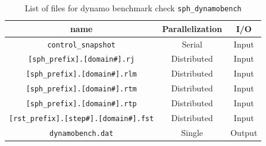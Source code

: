\begin{table}[htdp]
\caption{List of files for dynamo benchmark check {\tt sph\_dynamobench} }
\begin{center} 
\begin{tabular}{|c|c|c|}
\hline
 name & Parallelization & I/O \\ \hline \hline
\verb|control_snapshot| & Serial & Input \\ \hline
\verb|[sph_prefix].[domain#].rj|  & Distributed & Input \\
\verb|[sph_prefix].[domain#].rlm| & Distributed & Input \\
\verb|[sph_prefix].[domain#].rtm| & Distributed & Input \\
\verb|[sph_prefix].[domain#].rtp| & Distributed & Input \\ \hline
\verb|[rst_prefix].[step#].[domain#].fst| &  Distributed & Input  \\ \hline
\verb|dynamobench.dat| & Single & Output \\ \hline
\end{tabular}
\end{center}
\label{table:sph_dynamobench}
\end{table}

